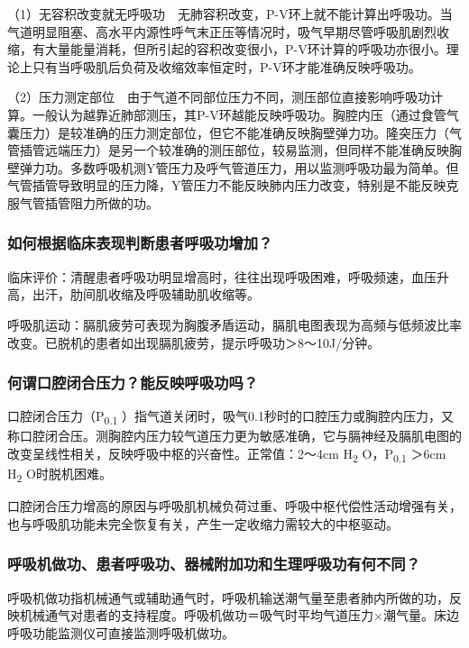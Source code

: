 （1）无容积改变就无呼吸功　无肺容积改变，P-V环上就不能计算出呼吸功。当气道明显阻塞、高水平内源性呼气末正压等情况时，吸气早期尽管呼吸肌剧烈收缩，有大量能量消耗，但所引起的容积改变很小，P-V环计算的呼吸功亦很小。理论上只有当呼吸肌后负荷及收缩效率恒定时，P-V环才能准确反映呼吸功。

（2）压力测定部位　由于气道不同部位压力不同，测压部位直接影响呼吸功计算。一般认为越靠近肺部测压，其P-V环越能反映呼吸功。胸腔内压（通过食管气囊压力）是较准确的压力测定部位，但它不能准确反映胸壁弹力功。隆突压力（气管插管远端压力）是另一个较准确的测压部位，较易监测，但同样不能准确反映胸壁弹力功。多数呼吸机测Y管压力及呼气管道压力，用以监测呼吸功最为简单。但气管插管导致明显的压力降，Y管压力不能反映肺内压力改变，特别是不能反映克服气管插管阻力所做的功。

\subsubsection{如何根据临床表现判断患者呼吸功增加？}

临床评价：清醒患者呼吸功明显增高时，往往出现呼吸困难，呼吸频速，血压升高，出汗，肋间肌收缩及呼吸辅助肌收缩等。

呼吸肌运动：膈肌疲劳可表现为胸腹矛盾运动，膈肌电图表现为高频与低频波比率改变。已脱机的患者如出现膈肌疲劳，提示呼吸功＞8～10J/分钟。

\subsubsection{何谓口腔闭合压力？能反映呼吸功吗？}

口腔闭合压力（P\textsubscript{0.1}
）指气道关闭时，吸气0.1秒时的口腔压力或胸腔内压力，又称口腔闭合压。测胸腔内压力较气道压力更为敏感准确，它与膈神经及膈肌电图的改变呈线性相关，反映呼吸中枢的兴奋性。正常值：2～4cm
H\textsubscript{2} O，P\textsubscript{0.1} ＞6cm H\textsubscript{2}
O时脱机困难。

口腔闭合压力增高的原因与呼吸肌机械负荷过重、呼吸中枢代偿性活动增强有关，也与呼吸肌功能未完全恢复有关，产生一定收缩力需较大的中枢驱动。

\subsubsection{呼吸机做功、患者呼吸功、器械附加功和生理呼吸功有何不同？}

呼吸机做功指机械通气或辅助通气时，呼吸机输送潮气量至患者肺内所做的功，反映机械通气对患者的支持程度。呼吸机做功＝吸气时平均气道压力×潮气量。床边呼吸功能监测仪可直接监测呼吸机做功。

